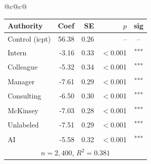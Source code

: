 \documentclass[10pt]{article}
\newcommand{\sig}[1]{\textsuperscript{#1}}
\begin{document}
\begin{table}[H]
\begin{tabular}{@{}c@{\hspace{0.5em}}c@{}}
\begin{minipage}[t]{0.49\textwidth}
\begin{tabular}{@{}l r r r c@{}}
\toprule
Authority & Coef & SE & $p$ & sig \\
\midrule
\cellcolor{gray!22}Control (icpt) & \cellcolor{gray!22}56.38 & \cellcolor{gray!22}0.26 & \cellcolor{gray!22}-- & \cellcolor{gray!22}-- \\
\midrule
Intern & -3.16 & 0.33 & $<$0.001 & \sig{***} \\
Colleague & -5.32 & 0.34 & $<$0.001 & \sig{***} \\
Manager & -7.61 & 0.29 & $<$0.001 & \sig{***} \\
\midrule
Consulting & -6.50 & 0.30 & $<$0.001 & \sig{***} \\
McKinsey & -7.03 & 0.28 & $<$0.001 & \sig{***} \\
\midrule
Unlabeled & -7.51 & 0.29 & $<$0.001 & \sig{***} \\
AI & -5.58 & 0.32 & $<$0.001 & \sig{***} \\
\midrule
\multicolumn{5}{c}{\scriptsize $n=2{,}400$, $R^2=0.381$} \\
\bottomrule\end{tabular}
\end{minipage} \\
\end{tabular}
\end{table}
\end{document}
